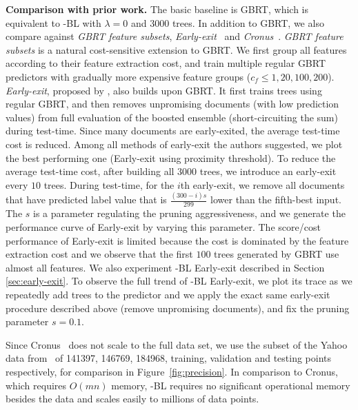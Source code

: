 \textbf{Comparison with prior work. } 
The basic baseline is GBRT, which is equivalent to \name{}-BL with $\lambda = 0$ and $3000$ trees. In addition to GBRT, we also compare against \emph{GBRT feature subsets}, \emph{Early-exit}~\citep{cambazoglu2010early} and \emph{Cronus}~\citep{chen2011}. \emph{GBRT feature subsets} is a natural cost-sensitive extension to GBRT. We first group all features according to their feature extraction cost, and train multiple regular GBRT predictors with gradually more expensive feature groups ($c_f \le 1, 20, 100, 200$). \emph{Early-exit}, proposed by \citet{cambazoglu2010early}, also builds upon GBRT. It first trains trees using regular GBRT, and then removes unpromising documents (with low prediction values) from full evaluation of the boosted ensemble (short-circuiting the sum) during test-time. Since many documents are early-exited, the average test-time cost is reduced. Among all methods of early-exit the authors suggested, we plot the best performing one (Early-exit using proximity threshold). To reduce the average test-time cost, after building all $3000$ trees, we introduce an early-exit every $10$ trees. During test-time, for the $i$th early-exit, we remove all documents that have predicted label value that is $\frac{(300-i)s}{299}$ lower than the fifth-best input. The $s$ is a parameter regulating the pruning aggressiveness, and we generate the performance curve of Early-exit by varying this parameter. The score/cost performance of Early-exit is limited because the cost is dominated by the feature extraction cost and we observe that the first $100$ trees generated by GBRT use almost all features. We also experiment \name{}-BL Early-exit described in Section \ref{sec:early-exit}. To observe the full trend of \name{}-BL Early-exit, we plot its trace as we repeatedly add trees to the predictor and we apply the exact same early-exit procedure described above (remove unpromising documents), and fix the pruning parameter $s = 0.1$.

Since Cronus~\cite{chen2011} does not scale to the full data set, we use the subset of the Yahoo data from~\citet{chen2011} of 141397, 146769, 184968, training, validation and testing points respectively, for comparison in Figure~\ref{fig:precision}. In comparison to Cronus, which requires $O(mn)$ memory, \name{}-BL requires no significant operational memory besides the data and scales easily to millions of data points.


